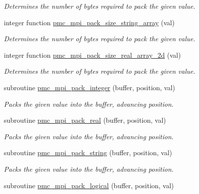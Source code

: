 \begin{DoxyCompactItemize}
\begin{DoxyCompactList}\small\item\em Determines the number of bytes required to pack the given value. \end{DoxyCompactList}\item 
integer function \mbox{\hyperlink{namespacepmc__mpi_af8c1a5c67870b10d526b694eb81d1cfd}{pmc\+\_\+mpi\+\_\+pack\+\_\+size\+\_\+string\+\_\+array}} (val)
\begin{DoxyCompactList}\small\item\em Determines the number of bytes required to pack the given value. \end{DoxyCompactList}\item 
integer function \mbox{\hyperlink{namespacepmc__mpi_a2a1623c5cced2ab99048a47dda8c00f1}{pmc\+\_\+mpi\+\_\+pack\+\_\+size\+\_\+real\+\_\+array\+\_\+2d}} (val)
\begin{DoxyCompactList}\small\item\em Determines the number of bytes required to pack the given value. \end{DoxyCompactList}\item 
subroutine \mbox{\hyperlink{namespacepmc__mpi_a2a91d7e00881e5ca711b2d0e8888c99b}{pmc\+\_\+mpi\+\_\+pack\+\_\+integer}} (buffer, position, val)
\begin{DoxyCompactList}\small\item\em Packs the given value into the buffer, advancing position. \end{DoxyCompactList}\item 
subroutine \mbox{\hyperlink{namespacepmc__mpi_a31bf74ee3630d12e15608dc16d564318}{pmc\+\_\+mpi\+\_\+pack\+\_\+real}} (buffer, position, val)
\begin{DoxyCompactList}\small\item\em Packs the given value into the buffer, advancing position. \end{DoxyCompactList}\item 
subroutine \mbox{\hyperlink{namespacepmc__mpi_a1e017c3cb891a6b0dbe1076d89ad255a}{pmc\+\_\+mpi\+\_\+pack\+\_\+string}} (buffer, position, val)
\begin{DoxyCompactList}\small\item\em Packs the given value into the buffer, advancing position. \end{DoxyCompactList}\item 
subroutine \mbox{\hyperlink{namespacepmc__mpi_a2480cf79bf376716fc38a026b5e01873}{pmc\+\_\+mpi\+\_\+pack\+\_\+logical}} (buffer, position, val)

\end{DoxyCompactItemize}
